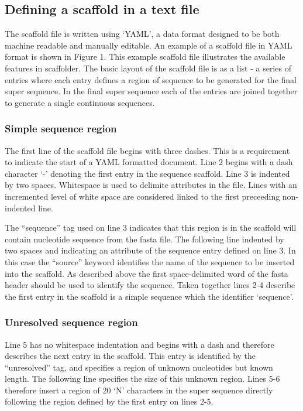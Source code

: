 \documentclass[10pt]{bmc_article}
\newenvironment{bmcformat}{\begin{raggedright}\baselineskip20pt\sloppy\setboolean{publ}{false}}{\end{raggedright}\baselineskip20pt\sloppy}
\begin{document}
\begin{bmcformat}
\subsection*{Defining a scaffold in a text file} %

The scaffold file is written using `YAML', a data format designed to be both
machine readable and manually editable. An example of a scaffold file in YAML
format is shown in Figure 1. This example scaffold file illustrates the
available features in scaffolder. The basic layout of the scaffold file is as
a list - a series of entries where each entry defines a region of sequence to
be generated for the final super sequence. In the final super sequence each of
the entries are joined together to generate a single continuous sequences. \pb

\subsubsection*{Simple sequence region} %

The first line of the scaffold file begins with three dashes. This is
a requirement to indicate the start of a YAML formatted document. Line 2 begins
with a dash character `-' denoting the first entry in the sequence scaffold.
Line 3 is indented by two spaces. Whitespace is used to delimite attributes in
the file. Lines with an incremented level of white space are considered linked
to the first preceeding non-indented line. \pb

The ``sequence'' tag used on line 3 indicates that this region is in the
scaffold will contain nucleotide sequence from the fasta file. The following
line indented by two spaces and indicating an attribute of the sequence entry
defined on line 3. In this case the ``source'' keyword identifies the name of
the sequence to be inserted into the scaffold. As described above the first
space-delimited word of the fasta header should be used to identify the
sequence. Taken together lines 2-4 describe the first entry in the scaffold is
a simple sequence which the identifier `sequence'. \pb

\subsubsection*{Unresolved sequence region} %

Line 5 has no whitespace indentation and begins with a dash and therefore
describes the next entry in the scaffold. This entry is identified by the
``unresolved'' tag, and specifies a region of unknown nucleotides but known
length. The following line specifies the size of this unknown region. Lines 5-6
therefore insert a region of 20 `N' characters in the super sequence directly
following the region defined by the first entry on lines 2-5. \pb


\end{bmcformat}
\end{document}
